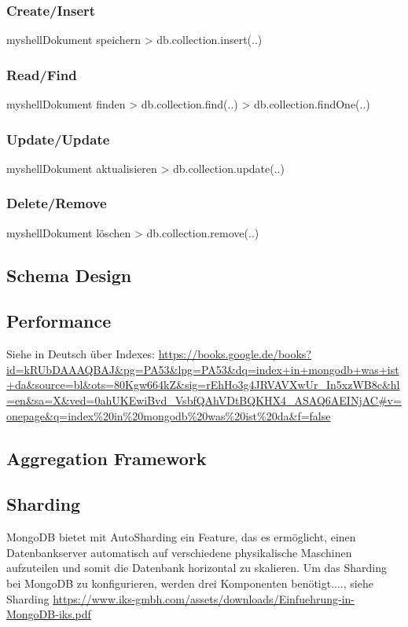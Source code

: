 \subsubsection{Create/Insert}
\begin{listingsboxShell}[label={lst:insert}]{myshell}{Dokument speichern}
> db.collection.insert(..)
\end{listingsboxShell}
\subsubsection{Read/Find}
\begin{listingsboxShell}[label={lst:find}]{myshell}{Dokument finden}
> db.collection.find(..)
> db.collection.findOne(..)
\end{listingsboxShell}
\subsubsection{Update/Update}
\begin{listingsboxShell}[label={lst:update}]{myshell}{Dokument aktualisieren}
> db.collection.update(..)
\end{listingsboxShell}
\subsubsection{Delete/Remove}
\begin{listingsboxShell}[label={lst:remove}]{myshell}{Dokument löschen}
> db.collection.remove(..)
\end{listingsboxShell}
\subsection{Schema Design}
\subsection{Performance}
Siehe in Deutsch über Indexes: \url{https://books.google.de/books?id=kRUbDAAAQBAJ&pg=PA53&lpg=PA53&dq=index+in+mongodb+was+ist+da&source=bl&ots=80Kgw664kZ&sig=rEhHo3g4JRVAVXwUr_In5xzWB8c&hl=en&sa=X&ved=0ahUKEwiBvd_VsbfQAhVDtBQKHX4_ASAQ6AEINjAC#v=onepage&q=index%20in%20mongodb%20was%20ist%20da&f=false}\newline

\subsection{Aggregation Framework}

\subsection{Sharding}\label{sharding}
MongoDB bietet mit AutoSharding ein Feature, das es ermöglicht, einen Datenbankserver automatisch auf verschiedene physikalische Maschinen aufzuteilen und somit die Datenbank horizontal zu skalieren. Um das Sharding bei MongoDB zu konfigurieren, werden drei Komponenten benötigt...., siehe Sharding \url{https://www.iks-gmbh.com/assets/downloads/Einfuehrung-in-MongoDB-iks.pdf
}

